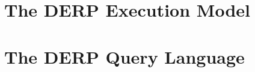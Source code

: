 \documentclass{article}
\begin{document}
\newpage
\section{\textbf{The DERP Execution Model}}






\newpage
\section{\textbf{The DERP Query Language}}





\end{document}
